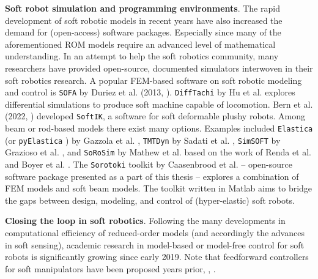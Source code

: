 \textbf{Soft robot simulation and programming environments}.
%
The rapid development of soft robotic models in recent years have also increased the demand for (open-access) software packages. Especially since many of the aforementioned ROM models require an advanced level of mathematical understanding. In an attempt to help the soft robotics community, many researchers have provided open-source, documented simulators interwoven in their soft robotics research. A popular FEM-based software on soft robotic modeling and control is \texttt{SOFA} by Duriez et al. (2013, \cite{Duriez2013,Coevoet2017}). \texttt{DiffTachi} by Hu et al. \cite{Hu2019taichi, Hu2019Oct} explores differential simulations to produce soft machine capable of locomotion. Bern et al. (2022, \cite{Bern2022,Bern2019}) developed \texttt{SoftIK}, a software for soft deformable plushy robots. Among beam or rod-based models there exist many options. Examples included \texttt{Elastica} (or \texttt{pyElastica} \cite{Tekinalp2022}) by Gazzola et al. \cite{Gazzola2018,Zhang2019}, \texttt{TMTDyn} by Sadati et al. \cite{Sadati2020}, \texttt{SimSOFT} by Grazioso et al. \cite{Grazioso2019}, and \texttt{SoRoSim} by Mathew et al. \cite{Mathew2021Jul} based on the work of Renda et al. \cite{Renda2020} and Boyer et al. \cite{Boyer2021}. The \texttt{Sorotoki} toolkit by Caasenbrood et al. \cite{SorotokiCode}  -- open-source software package presented as a part of this thesis  -- explores a combination of FEM models and soft beam models. The toolkit written in Matlab aims to bridge the gaps between design, modeling, and control of (hyper-elastic) soft robots.

\textbf{Closing the loop in soft robotics}. Following the many developments in computational efficiency of reduced-order models (and accordingly the advances in soft sensing), academic research in model-based or model-free control for soft robots is significantly growing since early 2019. Note that feedforward controllers for soft manipulators have been proposed years prior, \eg, \cite{Falkenhahn2015May,Falkenhahn2015,Thuruthel2017Oct,Satheeshbabu2019May}.

